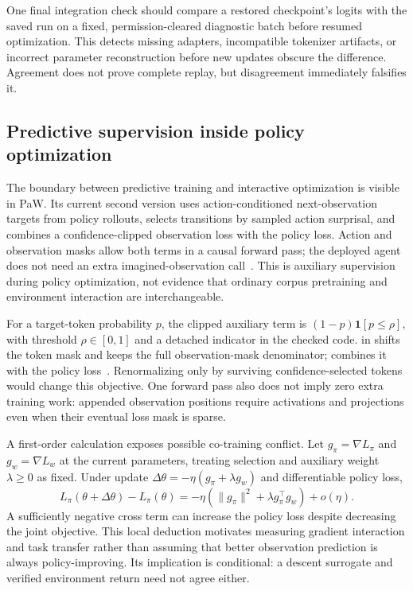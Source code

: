 One final integration check should compare a restored checkpoint's logits with the saved run on a fixed, permission-cleared diagnostic batch before resumed optimization. This detects missing adapters, incompatible tokenizer artifacts, or incorrect parameter reconstruction before new updates obscure the difference. Agreement does not prove complete replay, but disagreement immediately falsifies it.

\subsection{Predictive supervision inside policy optimization}
\label{sec:C07:worldcotraining}
The boundary between predictive training and interactive optimization is visible in PaW. Its current second version uses action-conditioned next-observation targets from policy rollouts, selects transitions by sampled action surprisal, and combines a confidence-clipped observation loss with the policy loss. Action and observation masks allow both terms in a causal forward pass; the deployed agent does not need an extra imagined-observation call~\cite{rewrite_paw2026}. This is auxiliary supervision during policy optimization, not evidence that ordinary corpus pretraining and environment interaction are interchangeable.

For a target-token probability $p$, the clipped auxiliary term is $(1-p)\mathbf1[p\leq\rho]$, with threshold $\rho\in[0,1]$ and a detached indicator in the checked code.  in  shifts the token mask and keeps the full observation-mask denominator;  combines it with the policy loss~\cite{rewrite_paw_repo}. Renormalizing only by surviving confidence-selected tokens would change this objective. One forward pass also does not imply zero extra training work: appended observation positions require activations and projections even when their eventual loss mask is sparse.

A first-order calculation exposes possible co-training conflict. Let $g_\pi=\nabla L_\pi$ and $g_w=\nabla L_w$ at the current parameters, treating selection and auxiliary weight $\lambda\geq0$ as fixed. Under update $\Delta\theta=-\eta(g_\pi+\lambda g_w)$ and differentiable policy loss,
\begin{equation}
 L_\pi(\theta+\Delta\theta)-L_\pi(\theta)
 =-\eta(\|g_\pi\|^2+\lambda g_\pi^\top g_w)
 +o(\eta).
\end{equation}
A sufficiently negative cross term can increase the policy loss despite decreasing the joint objective. This local deduction motivates measuring gradient interaction and task transfer rather than assuming that better observation prediction is always policy-improving. Its implication is conditional: a descent surrogate and verified environment return need not agree either.

